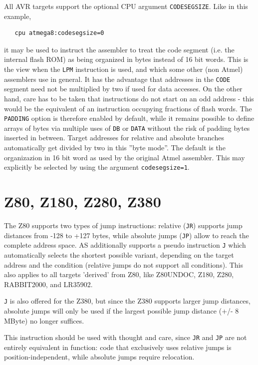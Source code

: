 \documentclass[12pt,twoside]{report}
\newcommand{\asname}{{AS}}
\begin{document}
All AVR targets support the optional CPU argument {\tt CODESEGSIZE}.
Like in this example,
\begin{verbatim}
   cpu atmega8:codesegsize=0
\end{verbatim}
it may be used to instruct the assembler to treat the code segment (i.e.
the internal flash ROM) as being organized in bytes instead of 16 bit words.
This is the view when the {\tt LPM} instruction is used, and which some other
(non Atmel) assemblers use in general.  It has the advantage that addresses 
in the {\tt CODE} segment need not be multiplied by two if used for data
accesses.  On the other hand, care has to be taken that instructions do
not start on an odd address - this would be the equivalent of an instruction
occupying fractions of flash words.  The {\tt PADDING} option is therefore
enabled by default, while it remains possible to define arrays of bytes via
multiple uses of {\tt DB} or {\tt DATA} without the risk of padding bytes
inserted in between.  Target addresses for relative and absolute branches 
automatically get divided by two in this ''byte mode''.  The default is the
organizazion in 16 bit word as used by the original Atmel assembler.  This
may explicitly be selected by using the argument \verb!codesegsize=1!.


\section{Z80, Z180, Z280, Z380}

The Z80 supports two types of jump instructions: relative ({\tt JR}) supports
jump distances from -128 to +127 bytes, while absolute jumps  ({\tt JP})
allow to reach the complete address space. \asname{} additionally supports
a pseudo instruction {\tt J} which automatically selects the shortest
possible variant, depending on the target address and the condition (relative
jumps do not support all conditions).  This also applies to all targets
'derived' from Z80, like Z80UNDOC, Z180, Z280, RABBIT2000, and LR35902.

{\tt J} is also offered for the Z380, but since the Z380 supports larger
jump distances, absolute jumps will only be used if the largest possible
jump distance (+/- 8 MByte) no longer suffices.

This instruction should be used with thought and care, since {\tt JR} and
{\tt JP} are not entirely equivalent in function: code that exclusively
uses relative jumps is position-independent, while absolute jumps
require relocation.
\end{document}
